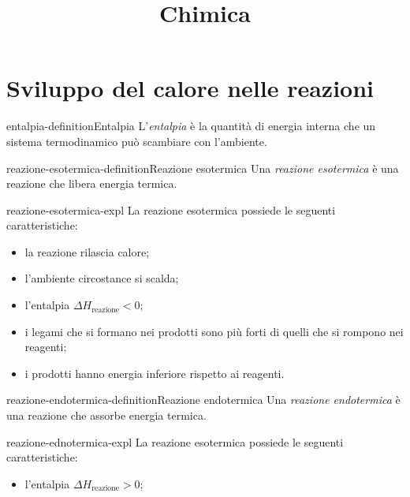 \documentclass[preview]{standalone}
\begin{document}
\title{Chimica}
\genpage

\section{Sviluppo del calore nelle reazioni}



\begin{snippetdefinition}{entalpia-definition}{Entalpia}
    L'\textit{entalpia} è la quantità di energia interna che un sistema
    termodinamico può scambiare con l'ambiente.
\end{snippetdefinition}

\begin{snippetdefinition}{reazione-esotermica-definition}{Reazione esotermica}
    Una \textit{reazione esotermica} è una reazione che libera energia termica.
\end{snippetdefinition}

\begin{snippet}{reazione-esotermica-expl}
    La reazione esotermica possiede le seguenti caratteristiche:
    \begin{itemize}
        \item la reazione rilascia calore;
        \item l'ambiente circostance si scalda;
        \item l'entalpia \(\Delta H_{\text{reazione}} < 0\);
        \item i legami che si formano nei prodotti sono più forti di quelli che si rompono nei reagenti;
        \item i prodotti hanno energia inferiore rispetto ai reagenti.
    \end{itemize}
\end{snippet}

\begin{snippetdefinition}{reazione-endotermica-definition}{Reazione endotermica}
    Una \textit{reazione endotermica} è una reazione che assorbe energia termica.
\end{snippetdefinition}

\begin{snippet}{reazione-ednotermica-expl}
    La reazione esotermica possiede le seguenti caratteristiche:
    \begin{itemize}
        \item l'entalpia \(\Delta H_{\text{reazione}} > 0\);
    \end{itemize}
\end{snippet}
\end{document}

